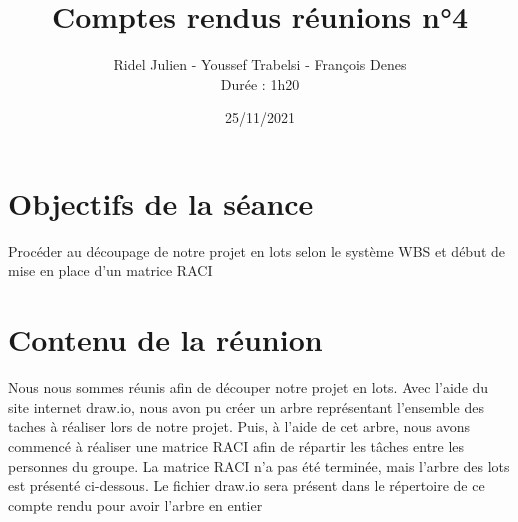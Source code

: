 \documentclass{article}
\title{\Huge Comptes rendus réunions n°4}
\author{Ridel Julien - Youssef Trabelsi - François Denes \\ Durée : 1h20}
\date{25/11/2021}
\begin{document}
\maketitle

\section{\huge Objectifs de la séance}

\Large Procéder au découpage de notre projet en lots selon le système WBS et début de mise en place d'un matrice RACI

\section{\huge Contenu de la réunion } 
\Large Nous nous sommes réunis afin de découper notre projet en lots. Avec l'aide du site internet draw.io, nous avon pu créer un arbre représentant l'ensemble des taches à réaliser lors de notre projet. Puis, à l'aide de cet arbre, nous avons commencé à réaliser une matrice RACI afin de répartir les tâches entre les personnes du groupe. La matrice RACI n'a pas été terminée, mais l'arbre des lots est présenté ci-dessous. Le fichier draw.io sera présent dans le répertoire de ce compte rendu pour avoir l'arbre en entier\\
\end{document}

